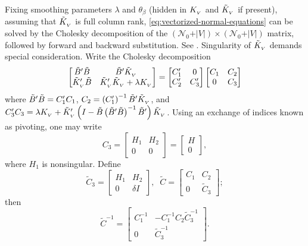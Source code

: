 Fixing smoothing parameters $\lambda$ and $\theta_\beta$ (hidden in $K_{_{\scriptscriptstyle V}}$ and $\tilde{K}_{_{\scriptscriptstyle V}}$ if present), assuming that $\tilde{K}_{_{\scriptscriptstyle V}}$ is full column rank, \eqref{eq:vectorized-normal-equations} can be solved by the Cholesky decomposition of the $\left(\mathcal{N}_0 + \vert V \vert  \right) \times \left(\mathcal{N}_0 + \vert V \vert  \right)$ matrix, followed by forward and backward substitution. See \cite{golub2012matrix}. Singularity of $\tilde{K}_{_{\scriptscriptstyle V}}$ demands special consideration. Write the Cholesky decomposition
\begin{equation} \label{eq:normal-equation-cholesky}
\begin{bmatrix}
\tilde{B}'\tilde{B} & \tilde{B}'\tilde{K}_{_{\scriptscriptstyle V}} \\
\tilde{K}_{_{\scriptscriptstyle V}}'\tilde{B} & \tilde{K}_{_{\scriptscriptstyle V}}'\tilde{K}_{_{\scriptscriptstyle V}} + \lambda K_{_{\scriptscriptstyle V}}\\
\end{bmatrix}
= \begin{bmatrix}
C'_1 & 0 \\
C'_2  & C'_3 
\end{bmatrix}
\begin{bmatrix}
C_1 & C_2 \\
0  & C_3 
\end{bmatrix}
\end{equation}
\noindent
where $\tilde{B}'\tilde{B} = C'_1 C_1$, $C_2 = \left(C'_1\right)^{-1} \tilde{B}' \tilde{K}_{_{\scriptscriptstyle V}}$, and $C'_3 C_3 = \lambda K_{_{\scriptscriptstyle V}} +  \tilde{K}_{_{\scriptscriptstyle V}}'\left( I - \tilde{B}\left( \tilde{B}' \tilde{B} \right)^{-1} \tilde{B}' \right)\tilde{K}_{_{\scriptscriptstyle V}}$. Using an exchange of indices known as pivoting, one may write 
\begin{equation*}
C_3 = \begin{bmatrix} H_1 & H_2 \\ 0 & 0 \end{bmatrix} = \begin{bmatrix} H \\  0 \end{bmatrix},
\end{equation*}
\noindent
where $H_1$ is nonsingular. Define
\begin{equation} \label{eq:cholesky-factor-mod}
\tilde{C}_3 = \begin{bmatrix}
H_1 & H_2 \\
0  & \delta I 
\end{bmatrix}, \;\;
\tilde{C} = \begin{bmatrix}
C_1 & C_2 \\
0  & \tilde{C}_3 
\end{bmatrix};
\end{equation}
\noindent
then
\begin{equation} \label{eq:cholesky-factor-mod-inverse}
\tilde{C}^{-1} = \begin{bmatrix}
C_1^{-1} & -C_1^{-1} C_2 \tilde{C}_3^{-1} \\
0  & \tilde{C}_3^{-1}
\end{bmatrix}.
\end{equation}

